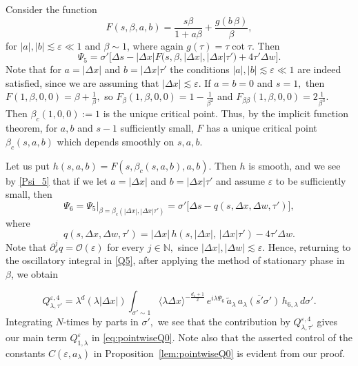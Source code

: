 \documentclass[leqno]{amsart}
\theoremstyle{definition}
\theoremstyle{remark}
\numberwithin{equation}{section}
\newcommand{\N}{\mathbb{N}}
\newcommand{\jp}[1]{\langle{#1}\rangle}
\newcommand\la{{\lambda}}
\newcommand\ve{{\varepsilon}}
\begin{document}
Consider the function
\[
F(s,\beta,a,b) = \frac{s \beta }{1 + a\beta} + \frac {g(b \, \beta)}\beta,
\]
for $|a|,|b|\lesssim \ve\ll 1$ and $\beta \sim 1$, where  again $g(\tau) = \tau \cot \tau$. Then
\begin{equation}\label{Psi_5}
\Psi_5 = \sigma'\Big[\Delta s - \left|\Delta x\right|F\big(s,\beta,|\Delta x|,|\Delta x| \tau'\big) + 4 \tau' \Delta w\Big] .
\end{equation}
Note that for $a = |\Delta x|$ and $b = |\Delta x| \tau'$ the conditions $|a|,|b|\lesssim \ve\ll 1$  are indeed satisfied, since we are assuming that $|\Delta x|\lesssim \ve.$ 
If $a = b = 0$ and $s=1,$ then $F(1,\beta,0,0)=\beta+\frac 1\beta,$ so $F_\beta(1,\beta,0,0)=1-\frac 1{\beta^2}$ and $F_{\beta \beta}(1,\beta,0,0)=2\frac 1{\beta^3}.$ Then  $\beta_c(1,0,0):=1$ is the unique  critical point. Thus, by the implicit function theorem,  for $a,b$ and $s-1$  sufficiently small, $F$ has a unique critical point $\beta_c(s,a,b)$ which depends smoothly on $s,a,b.$ 

Let us  put $h(s,a,b)=F(s,\beta_c(s,a,b),a,b).$ Then $h$ is smooth, and we see  by \eqref{Psi_5} that if we let $a = |\Delta x|$ and $b = |\Delta x| \tau'$ and assume $\ve$ to be sufficiently small,  then
\begin{equation}
\Psi_6=\Psi_5\big|_{\beta = \beta_c(|\Delta x|,|\Delta x| \tau')}
 =\sigma'\Big[\Delta s-q(s,\Delta x,\Delta w,\tau')\Big], \label{eq:Psi5}
  \end{equation}
  where 
$$
  q(s,\Delta x,\Delta w,\tau')=|\Delta x|\, h(s,|\Delta x|,\,|\Delta x| \tau')- 4 \tau' \Delta w.
 $$ 
  Note that $\partial_{s}^j q = \mathcal O(\ve)$ for every $j\in\N,$ since $|\Delta x|,|\Delta w|\lesssim \ve.$
Hence, returning to the oscillatory integral in \eqref{Q5}, after applying the method of stationary phase in $\beta$, we obtain

\begin{equation*}
Q^{\varepsilon,4}_{\lambda,\tau'}=\lambda^d (\la |\Delta x|) \int_{\sigma' \sim 1} \jp{\lambda\Delta x}^{-\frac{d_1+1}2} \, e^{i\lambda \Psi_6} \, \tilde a_\la \,\overline{a_\lambda(s'\sigma')}  \, h_{6,\lambda}\, d\sigma'.\label{Q6}
\end{equation*}
Integrating $N$-times by parts in $\sigma',$ we see that the contribution by  $Q^{\varepsilon,4}_{\lambda,\tau'}$ gives our main term $Q^{\ve}_{1,\la}$ in \eqref{eq:pointwiseQ0}.  Note  also that the  asserted control of the constants $C(\ve,a_\la)$ in Proposition~\ref{lem:pointwiseQ0} is evident from our proof.
\end{document}
